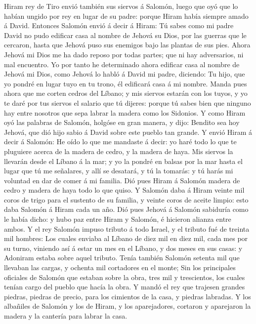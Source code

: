  Hiram rey de Tiro envió también sus siervos á Salomón,
luego que oyó que lo habían ungido por rey en lugar de su padre: porque
Hiram había siempre amado á David.  Entonces Salomón envió á
decir á Hiram:  Tú sabes como mi padre David no pudo
edificar casa al nombre de Jehová su Dios, por las guerras que le
cercaron, hasta que Jehová puso sus enemigos bajo las plantas de sus
pies.  Ahora Jehová mi Dios me ha dado reposo por todas
partes; que ni hay adversarios, ni mal encuentro.  Yo por
tanto he determinado ahora edificar casa al nombre de Jehová mi Dios,
como Jehová lo habló á David mi padre, diciendo: Tu hijo, que yo pondré
en lugar tuyo en tu trono, él edificará casa á mi nombre. 
Manda pues ahora que me corten cedros del Líbano; y mis siervos estarán
con los tuyos, y yo te daré por tus siervos el salario que tú dijeres:
porque tú sabes bien que ninguno hay entre nosotros que sepa labrar la
madera como los Sidonios.  Y como Hiram oyó las palabras de
Salomón, holgóse en gran manera, y dijo: Bendito sea hoy Jehová, que dió
hijo sabio á David sobre este pueblo tan grande.  Y envió
Hiram á decir á Salomón: He oído lo que me mandaste á decir: yo haré
todo lo que te pluguiere acerca de la madera de cedro, y la madera de
haya.  Mis siervos la llevarán desde el Líbano á la mar; y
yo la pondré en balsas por la mar hasta el lugar que tú me señalares, y
allí se desatará, y tú la tomarás: y tú harás mi voluntad en dar de
comer á mi familia.  Dió pues Hiram á Salomón madera de
cedro y madera de haya todo lo que quiso.  Y Salomón daba á
Hiram veinte mil coros de trigo para el sustento de su familia, y veinte
coros de aceite limpio: esto daba Salomón á Hiram cada un año.
 Dió pues Jehová á Salomón sabiduría como le había dicho: y
hubo paz entre Hiram y Salomón, é hicieron alianza entre ambos.
 Y el rey Salomón impuso tributo á todo Israel, y el
tributo fué de treinta mil hombres:  Los cuales enviaba al
Líbano de diez mil en diez mil, cada mes por su turno, viniendo así á
estar un mes en el Líbano, y dos meses en sus casas: y Adoniram estaba
sobre aquel tributo.  Tenía también Salomón setenta mil que
llevaban las cargas, y ochenta mil cortadores en el monte; 
Sin los principales oficiales de Salomón que estaban sobre la obra, tres
mil y trescientos, los cuales tenían cargo del pueblo que hacía la obra.
 Y mandó el rey que trajesen grandes piedras, piedras de
precio, para los cimientos de la casa, y piedras labradas. 
Y los albañiles de Salomón y los de Hiram, y los aparejadores, cortaron
y aparejaron la madera y la cantería para labrar la casa.

